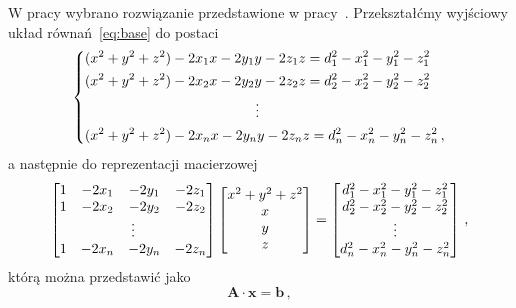 W pracy wybrano rozwiązanie przedstawione w pracy~\cite{norrdine2012algebraic}. Przekształćmy wyjściowy układ równań~\ref{eq:base} do postaci
\begin{equation}
    \begin{dcases}
        (x^2 + y^2 + z^2) - 2x_1x - 2y_1y - 2z_1z = d_1^2 - x_1^2 - y_1^2 - z_1^2 \\
        (x^2 + y^2 + z^2) - 2x_2x - 2y_2y - 2z_2z = d_2^2 - x_2^2 - y_2^2 - z_2^2 \\
        \mspace{220mu}\vdots                                                      \\
        (x^2 + y^2 + z^2) - 2x_n x - 2y_n y - 2z_n z = d_n^2 - x_n^2 - y_n^2 - z_n^2\,,
    \end{dcases}
\end{equation}
a następnie do reprezentacji macierzowej
\begin{equation}
    \left[
        \begin{matrix}
            1 & -2x_1 & -2y_1 & -2z_1  \\
            1 & -2x_2 & -2y_2 & -2z_2  \\
            \multicolumn{4}{c}{\vdots} \\
            1 & -2x_n & -2y_n & -2z_n  \\
        \end{matrix}
        \right]
    \left[
        \begin{matrix}
            x^2 + y^2 + z^2 \\
            x               \\
            y               \\
            z               \\
        \end{matrix}
        \right]
    =
    \left[
        \begin{matrix}
            d_1^2 - x_1^2 - y_1^2 - z_1^2 \\
            d_2^2 - x_2^2 - y_2^2 - z_2^2 \\
            \vdots                        \\
            d_n^2 - x_n^2 - y_n^2 - z_n^2 \\
        \end{matrix}
        \right]\,,
\end{equation}
którą można przedstawić jako
\begin{equation}
    \mathbf{A} \cdot \mathbf{x} = \mathbf{b}\,,
    \label{eq:matrix}
\end{equation}

